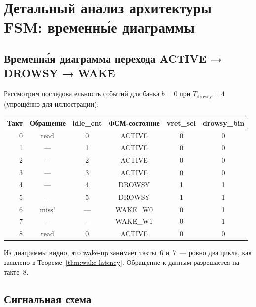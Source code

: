 \section{Детальный анализ архитектуры FSM: временны́е диаграммы}
\label{sec:glava89-timing}

\subsection{Временна́я диаграмма перехода ACTIVE → DROWSY → WAKE}

Рассмотрим последовательность событий для банка $b=0$
при $T_\mathrm{drowsy} = 4$ (упрощённо для иллюстрации):
%
\begin{center}
\begin{tabular}{|r|c|c|c|c|c|}
  \hline
  \textbf{Такт} & \textbf{Обращение} & \textbf{idle\_cnt} & \textbf{ФСМ-состояние}
    & \textbf{vret\_sel} & \textbf{drowsy\_bin} \\
  \hline
  0  & read  & 0 & ACTIVE  & 0 & 0 \\
  1  & —     & 1 & ACTIVE  & 0 & 0 \\
  2  & —     & 2 & ACTIVE  & 0 & 0 \\
  3  & —     & 3 & ACTIVE  & 0 & 0 \\
  4  & —     & 4 & DROWSY  & 1 & 1 \\
  5  & —     & 5 & DROWSY  & 1 & 1 \\
  6  & miss! & — & WAKE\_W0 & 0 & 1 \\
  7  & —     & — & WAKE\_W1 & 0 & 1 \\
  8  & read  & 0 & ACTIVE  & 0 & 0 \\
  \hline
\end{tabular}
\end{center}
%
Из диаграммы видно, что wake-up занимает такты~6 и~7~---
ровно два цикла, как заявлено в Теореме~\ref{thm:wake-latency}.
Обращение к данным разрешается на такте~8.

\subsection{Сигнальная схема}

